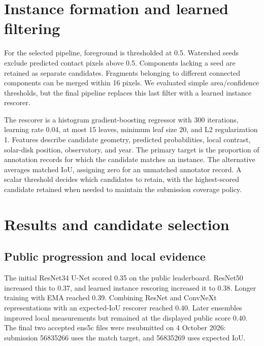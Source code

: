\documentclass[sigconf,nonacm]{acmart}
\begin{document}
\section{Instance formation and learned filtering}
For the selected pipeline, foreground is thresholded at 0.5. Watershed
seeds exclude predicted contact pixels above 0.5. Components lacking a seed
are retained as separate candidates. Fragments belonging to different
connected components can be merged within 16 pixels. We evaluated simple
area/confidence thresholds, but the final pipeline replaces this last
filter with a learned instance rescorer.

The rescorer is a histogram gradient-boosting regressor with 300 iterations,
learning rate 0.04, at most 15 leaves, minimum leaf size 20, and L2
regularization 1. Features describe candidate geometry, predicted
probabilities, local contrast, solar-disk position, observatory, and year.
The primary target is the proportion of annotation records for which the
candidate matches an instance. The alternative averages matched IoU,
assigning zero for an unmatched annotator record. A scalar threshold decides
which candidates to retain, with the highest-scored candidate retained when
needed to maintain the submission coverage policy.

\clearpage
\section{Results and candidate selection}
\subsection{Public progression and local evidence}
The initial ResNet34 U-Net scored 0.35 on the public leaderboard. ResNet50
increased this to 0.37, and learned instance rescoring increased it to 0.38.
Longer training with EMA reached 0.39. Combining ResNet and ConvNeXt
representations with an expected-IoU rescorer reached 0.40. Later ensembles
improved local measurements but remained at the displayed public score 0.40.
The final two accepted ens5c files were resubmitted on 4 October 2026:
submission 56835266 uses the match target, and 56835269 uses expected IoU.
\end{document}
